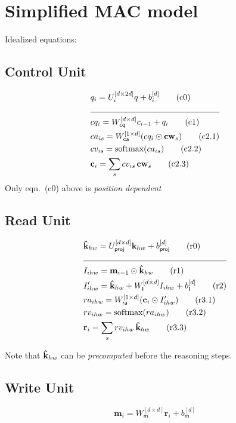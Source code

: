 \section{Simplified MAC model}

Idealized equations:
\subsection*{Control Unit}

\begin{align*}
	&q_i = U_i^{[d \times 2d]} q + b_i^{[d]}  \tag{c0} \\
	\cline{1-2}
	&cq_i = W_{\textsf{cq}}^{[d \times d]} c_{i-1} + q_i  \tag{c1} \\
	&ca_{is} = W_{\textsf{ca}}^{[1 \times d]} (cq_i \odot \mathbf{cw}_s)  \tag{c2.1}\\
	&cv_{is} = \textrm{softmax}(ca_{is}) \tag{c2.2}\\
	&\mathbf{c}_i = \sum_s cv_{is} \, \mathbf{cw}_s  \tag{c2.3}
\end{align*}
Only eqn.~(c0) above is \emph{position dependent}

\subsection*{Read Unit}

\begin{align*}
	&\mathbf{\tk}_{hw} = U_{\textsf{proj}}^{[d \times d]} \mathbf{k}_{hw} + b_{\textsf{proj}}^{[d]} \tag{r0} \\
	\cline{1-2}
	&I_{ihw} = \mathbf{m}_{i-1} \odot \mathbf{\tk}_{hw} \tag{r1} \\
	&I'_{ihw} = \mathbf{\tk}_{hw}  + W_{\textsf{I}}^{[d \times d]} I_{ihw} + b_{\textsf{I}}^{[d]}  \tag{r2} \\
	&ra_{ihw} = W_{\textsf{ra}}^{[1 \times d]} (\mathbf{c}_i \odot I'_{ihw})  \tag{r3.1}\\
	&rv_{ihw} = \textrm{softmax}(ra_{ihw}) \tag{r3.2}\\
	&\mathbf{r}_i = \sum_s rv_{ihw} \, \mathbf{\tk}_{hw}  \tag{r3.3}
\end{align*}

Note that $\mathbf{\hat{k}}_{hw}$ can be \emph{precomputed} before the reasoning steps.

\subsection*{Write Unit}

\begin{equation}
\mathbf{m}_i = W_{\textsf{m}}^{[d \times d]} \mathbf{r}_i + b_{\textsf{m}}^{[d]} \tag{w1}
\end{equation}
